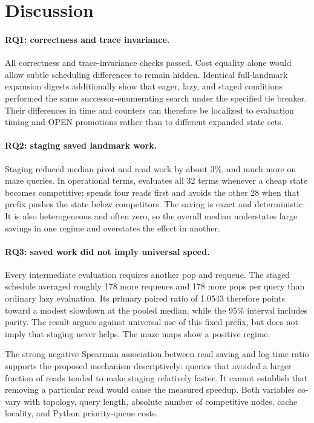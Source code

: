 \section{Discussion}
\label{sec:discussion}

\paragraph{RQ1: correctness and trace invariance.}
All correctness and trace-invariance checks passed.  Cost equality
alone would allow subtle scheduling differences to remain hidden.  Identical
full-landmark expansion digests additionally show that eager, lazy, and staged
conditions performed the same successor-enumerating search under the specified
tie breaker.  Their differences in time and counters can therefore be
localized to evaluation timing and OPEN promotions rather than to different
expanded state sets.

\paragraph{RQ2: staging saved landmark work.}
Staging reduced median pivot and read work by about 3\%, and much more on maze
queries.  In operational terms,
\LazyFull{} evaluates all 32 terms whenever a cheap state becomes competitive;
\Staged{} spends four reads first and avoids the other 28 when that prefix
pushes the state below competitors.  The saving is exact and deterministic.
It is also heterogeneous and often zero, so the overall median understates
large savings in one regime and overstates the effect in another.

\paragraph{RQ3: saved work did not imply universal speed.}
Every intermediate evaluation requires another pop and requeue.  The staged
schedule averaged roughly 178 more requeues and 178 more pops per query than
ordinary lazy evaluation.  Its primary paired ratio of 1.0543 therefore points toward
a modest slowdown at the pooled median, while the 95\% interval includes
parity.  The result argues against universal use of this fixed prefix, but does
not imply that staging never helps.  The maze maps show a positive regime.

The strong negative Spearman association between read saving and log time
ratio supports the proposed mechanism descriptively: queries that avoided a
larger fraction of reads tended to make staging relatively faster.  It cannot
establish that removing a particular read would cause the measured speedup.
Both variables co-vary with topology, query length, absolute number of
competitive nodes, cache locality, and Python priority-queue costs.


